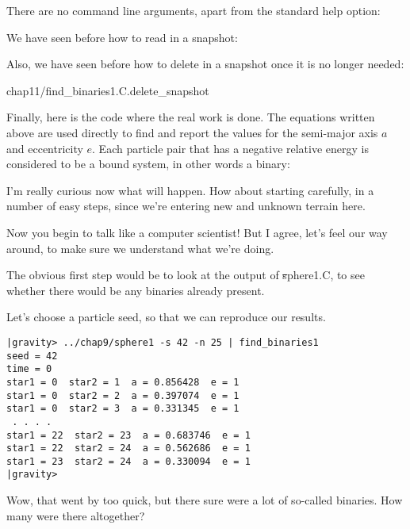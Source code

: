There are no command line arguments, apart from the standard help option:


We have seen before how to read in a snapshot:


Also, we have seen before how to delete in a snapshot once it is no
longer needed:

     {chap11/find_binaries1.C.delete_snapshot}

Finally, here is the code where the real work is done.  The equations
written above are used directly to find and report the values for the
semi-major axis $a$ and eccentricity $e$.  Each particle pair that has
a negative relative energy is considered to be a bound system, in
other words a binary:


\abc

\bob
I'm really curious now what will happen.  How about starting
carefully, in a number of easy steps, since we're entering new and
unknown terrain here.

\carol
Now you begin to talk like a computer scientist!  But I agree, let's
feel our way around, to make sure we understand what we're doing.

\alice
The obvious first step would be to look at the output of {\st sphere1.C},
to see whether there would be any binaries already present.

\bob
Let's choose a particle seed, so that we can reproduce our results.

\cba

\begin{small}
\begin{verbatim}
|gravity> ../chap9/sphere1 -s 42 -n 25 | find_binaries1
seed = 42
time = 0
star1 = 0  star2 = 1  a = 0.856428  e = 1
star1 = 0  star2 = 2  a = 0.397074  e = 1
star1 = 0  star2 = 3  a = 0.331345  e = 1
 . . . .
star1 = 22  star2 = 23  a = 0.683746  e = 1
star1 = 22  star2 = 24  a = 0.562686  e = 1
star1 = 23  star2 = 24  a = 0.330094  e = 1
|gravity> 
\end{verbatim}
\end{small}

\abc

\carol
Wow, that went by too quick, but there sure were a lot of so-called
binaries.  How many were there altogether?

